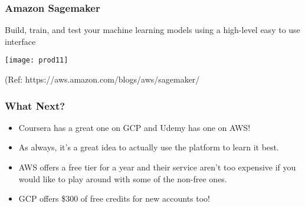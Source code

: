 \begin{frame}\frametitle{Amazon Sagemaker}
Build, train, and test your machine learning models using a high-level easy to use interface

\begin{center}
\texttt{[image: prod11]}
\end{center}

{\tiny (Ref: https://aws.amazon.com/blogs/aws/sagemaker/}
\end{frame}

\begin{frame}\frametitle{What Next?}
\begin{itemize}
\item Coursera has a great one on GCP and Udemy has one on AWS! 
\item As always, it’s a great idea to actually use the platform to learn it best. 
\item AWS offers a free tier for a year and their service aren’t too expensive if you would like to play around with some of the non-free ones. 
\item GCP offers \$300 of free credits for new accounts too!
\end{itemize}

\end{frame}